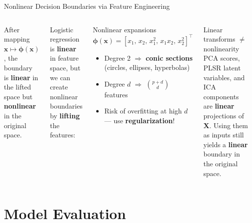 \documentclass[aspectratio=169,11pt]{beamer}
\begin{document}
\begin{frame}{Nonlinear Decision Boundaries via Feature Engineering}
\begin{columns}[T]
\begin{center}
\vspace{0.3em}
{\footnotesize After mapping $\boldsymbol{x}\mapsto\boldsymbol{\phi}(\boldsymbol{x})$, the boundary\\
is \textbf{linear} in the lifted space but\\
\textbf{nonlinear} in the original space.}
\end{center}

\vspace{-0.5em}
Logistic regression is \textbf{linear} in feature space, but we can create nonlinear boundaries by \textbf{lifting} the features:

\vspace{-0.5em}
\begin{block}{Nonlinear expansions}
\vspace{-0.5em}
\[
  \boldsymbol{\phi}(\boldsymbol{x}) = [x_1,\, x_2,\, x_1^2,\, x_1 x_2,\, x_2^2]^\top
\]
\vspace{-0.8em}
\begin{itemize}
  \item Degree 2 $\Rightarrow$ \textbf{conic sections} (circles, ellipses, hyperbolas)
  \item Degree $d$ $\Rightarrow$ $\binom{p+d}{d}$ features
  \item Risk of overfitting at high $d$--- use \textbf{regularization}!
\end{itemize}
\end{block}
\begin{alertblock}{Linear transforms $\neq$ nonlinearity}
PCA scores, PLSR latent variables, and ICA components are \textbf{linear} projections of $\mathbf{X}$. Using them as inputs still yields a \textbf{linear} boundary in the original space. 
\end{alertblock}
\end{columns}
\end{frame}

\section{Model Evaluation}
\end{document}
